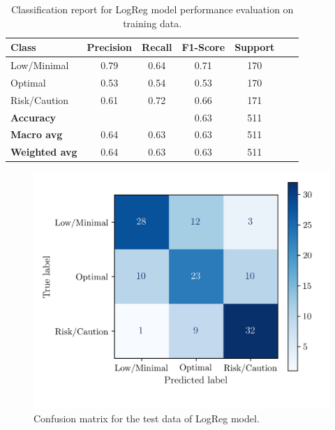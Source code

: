 \documentclass[conference]{IEEEtran}
\begin{document}
\begin{table}[H]
\centering
\caption{Classification report for LogReg model performance evaluation on training data.}
\label{crTrainLogReg}
\begin{tabular}{lcccccc}
\toprule
\textbf{Class} & \textbf{Precision} & \textbf{Recall} & \textbf{F1-Score} & \textbf{Support} \\
\midrule
Low/Minimal & 0.79 & 0.64 & 0.71 & 170 \\
Optimal & 0.53 & 0.54 & 0.53 & 170 \\
Risk/Caution & 0.61 & 0.72 & 0.66 & 171 \\
\midrule
\textbf{Accuracy} &  &  & 0.63 & 511 \\
\textbf{Macro avg} & 0.64 & 0.63 & 0.63 & 511 \\
\textbf{Weighted avg} & 0.64 & 0.63 & 0.63 & 511 \\
\bottomrule
\end{tabular}
\end{table}

\begin{figure}[H]
    \centering
    \includegraphics[width=1\linewidth]{assets/LOGR_confmatTest.png}
    \caption{Confusion matrix for the test data of LogReg model.}
    \label{lcLogReg}
\end{figure}
\end{document}
